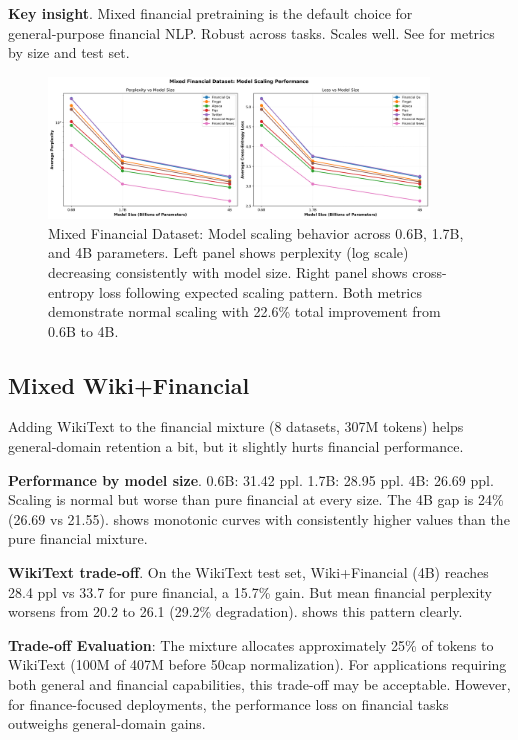 \textbf{Key insight}. Mixed financial pretraining is the default choice for general‑purpose financial NLP. Robust across tasks. Scales well. See  for metrics by size and test set.

\begin{figure}[h]
\centering
\includegraphics[width=0.9\textwidth]{figures/scaling_mixed_financial.png}
\caption[Mixed Financial Dataset: Scaling Behavior]{Mixed Financial Dataset: Model scaling behavior across 0.6B, 1.7B, and 4B parameters. Left panel shows perplexity (log scale) decreasing consistently with model size. Right panel shows cross-entropy loss following expected scaling pattern. Both metrics demonstrate normal scaling with 22.6\% total improvement from 0.6B to 4B.}
\label{fig:scaling_mixed_financial}
\end{figure}



\subsection{Mixed Wiki+Financial}

Adding WikiText to the financial mixture (8 datasets, 307M tokens) helps general‑domain retention a bit, but it slightly hurts financial performance.

\textbf{Performance by model size}. 0.6B: 31.42 ppl. 1.7B: 28.95 ppl. 4B: 26.69 ppl. Scaling is normal but worse than pure financial at every size. The 4B gap is 24\% (26.69 vs 21.55).  shows monotonic curves with consistently higher values than the pure financial mixture.

\textbf{WikiText trade‑off}. On the WikiText test set, Wiki+Financial (4B) reaches 28.4 ppl vs 33.7 for pure financial, a 15.7\% gain. But mean financial perplexity worsens from 20.2 to 26.1 (29.2\% degradation).  shows this pattern clearly.

\textbf{Trade-off Evaluation}: The mixture allocates approximately 25\% of tokens to WikiText (100M of 407M before 50cap normalization). For applications requiring both general and financial capabilities, this trade-off may be acceptable. However, for finance-focused deployments, the performance loss on financial tasks outweighs general-domain gains.


